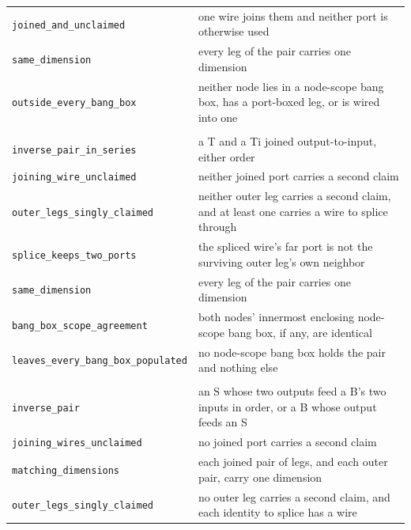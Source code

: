 \begin{xltabular}{\textwidth}{@{}>{\raggedright\arraybackslash}p{0.42\textwidth}>{\raggedright\arraybackslash}X@{}}
\quad\texttt{joined\_\allowbreak{}and\_\allowbreak{}unclaimed} & one wire joins them and neither port is otherwise used \\
\quad\texttt{same\_\allowbreak{}dimension} & every leg of the pair carries one dimension \\
\quad\texttt{outside\_\allowbreak{}every\_\allowbreak{}bang\_\allowbreak{}box} & neither node lies in a node-scope bang box, has a port-boxed leg, or is wired into one \\
\midrule
{}\\
\quad\texttt{inverse\_\allowbreak{}pair\_\allowbreak{}in\_\allowbreak{}series} & a T and a Ti joined output-to-input, either order \\
\quad\texttt{joining\_\allowbreak{}wire\_\allowbreak{}unclaimed} & neither joined port carries a second claim \\
\quad\texttt{outer\_\allowbreak{}legs\_\allowbreak{}singly\_\allowbreak{}claimed} & neither outer leg carries a second claim, and at least one carries a wire to splice through \\
\quad\texttt{splice\_\allowbreak{}keeps\_\allowbreak{}two\_\allowbreak{}ports} & the spliced wire's far port is not the surviving outer leg's own neighbor \\
\quad\texttt{same\_\allowbreak{}dimension} & every leg of the pair carries one dimension \\
\quad\texttt{bang\_\allowbreak{}box\_\allowbreak{}scope\_\allowbreak{}agreement} & both nodes' innermost enclosing node-scope bang box, if any, are identical \\
\quad\texttt{leaves\_\allowbreak{}every\_\allowbreak{}bang\_\allowbreak{}box\_\allowbreak{}populated} & no node-scope bang box holds the pair and nothing else \\
\midrule
{}\\
\quad\texttt{inverse\_\allowbreak{}pair} & an S whose two outputs feed a B's two inputs in order, or a B whose output feeds an S \\
\quad\texttt{joining\_\allowbreak{}wires\_\allowbreak{}unclaimed} & no joined port carries a second claim \\
\quad\texttt{matching\_\allowbreak{}dimensions} & each joined pair of legs, and each outer pair, carry one dimension \\
\quad\texttt{outer\_\allowbreak{}legs\_\allowbreak{}singly\_\allowbreak{}claimed} & no outer leg carries a second claim, and each identity to splice has a wire \\

\end{xltabular}
